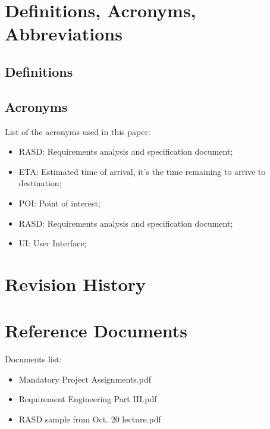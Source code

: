 \section{Definitions, Acronyms, Abbreviations}
%
\subsection{Definitions}
%
\subsection{Acronyms}
List of the acronyms used in this paper:
\begin{itemize}
\item RASD: Requirements analysis and specification document;
\item ETA: Estimated time of arrival, it's the time remaining to arrive to destination;
\item POI: Point of interest;
\item RASD: Requirements analysis and specification document;
\item UI: User Interface;
\end{itemize}
%
%
\section{Revision History}
%
%
\section{Reference Documents}
Documents list:
\begin{itemize}
\item Mandatory Project Assignments.pdf
\item Requirement Engineering Part III.pdf
\item RASD sample from Oct. 20 lecture.pdf
\end{itemize}
%
%
